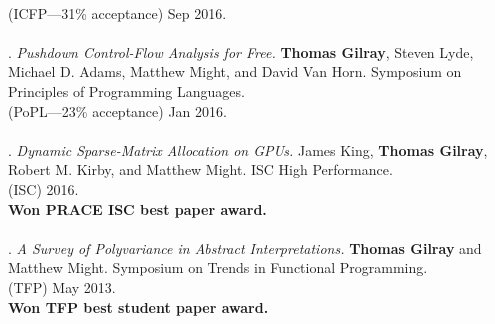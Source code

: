 \\(ICFP---31\% acceptance) Sep 2016. 
\\ \vspace{-0.1cm}\\
\paper. \textit{Pushdown Control-Flow Analysis for Free.}
\textbf{Thomas Gilray}, Steven Lyde, Michael D. Adams, Matthew Might, and David Van Horn.
Symposium on Principles of Programming Languages.
\\(PoPL---23\% acceptance) Jan 2016. 
\\ \vspace{-0.1cm}\\
\paper. \textit{Dynamic Sparse-Matrix Allocation on GPUs.}
James King, \textbf{Thomas Gilray}, Robert M. Kirby, and Matthew Might.
ISC High Performance.
\\(ISC) 2016. 
\\\textbf{Won PRACE ISC best paper award.} \\ \vspace{-0.1cm}\\
\paper. \textit{A Survey of Polyvariance in Abstract Interpretations.}
\textbf{Thomas Gilray} and Matthew Might.
Symposium on Trends in Functional Programming.
\\(TFP) May 2013. 
\\\textbf{Won TFP best student paper award.} \\ \vspace{-0.1cm}\\
